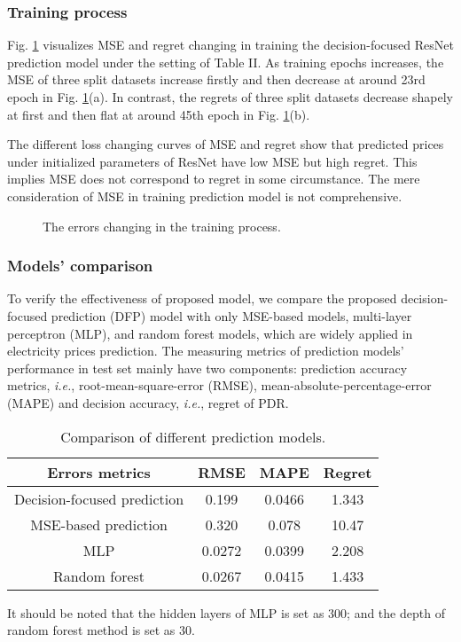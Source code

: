 \documentclass[journal]{IEEEtran}
\begin{document}
\subsubsection{Training process}
Fig. \ref{Training_process} visualizes MSE and regret changing in training the decision-focused ResNet prediction model under the setting of Table II. As training epochs increases, the MSE of three split datasets increase firstly and then decrease at around 23rd epoch in Fig. \ref{Training_process}(a). In contrast, the regrets of three split datasets decrease shapely at first and then flat at around 45th epoch in Fig. \ref{Training_process}(b). 

The different loss changing curves of MSE and regret show that predicted prices under initialized parameters of ResNet have low MSE but high regret. This implies MSE does not correspond to regret in some circumstance. The mere consideration of MSE in training prediction model is not comprehensive.

\begin{figure}[ht]
  \centering
  \qquad
  \caption{The errors changing in the training process.}
  \label{Training_process}
\end{figure}

\subsubsection{Models' comparison}
To verify the effectiveness of proposed model, we compare the proposed decision-focused prediction (DFP) model with only MSE-based models, multi-layer perceptron (MLP), and random forest models, which are widely applied in electricity prices prediction. The measuring metrics of prediction models' performance in test set mainly have two components: prediction accuracy metrics, \textit{i.e.}, root-mean-square-error (RMSE), mean-absolute-percentage-error (MAPE) and decision accuracy, \textit{i.e.}, regret of PDR. 
\begin{table}[!t]
  \renewcommand{\arraystretch}{1.3}
  \centering
  \label{models_comparison}
  \caption{Comparison of different prediction models.}
  \begin{tabular}{cccc}
    \hline
    Errors metrics &  RMSE & MAPE & Regret \\
    \hline
    Decision-focused prediction & 0.199 & 0.0466 & 1.343  \\
    MSE-based prediction & 0.320 & 0.078 & 10.47 \\
    MLP & 0.0272 & 0.0399 & 2.208\\
    Random forest & 0.0267 & 0.0415 & 1.433 \\
    \hline
  \end{tabular}
  \vspace{1ex}

  {\raggedright It should be noted that the hidden layers of MLP is set as 300; and the depth of random forest method is set as 30.\par}
\end{table}
\end{document}
